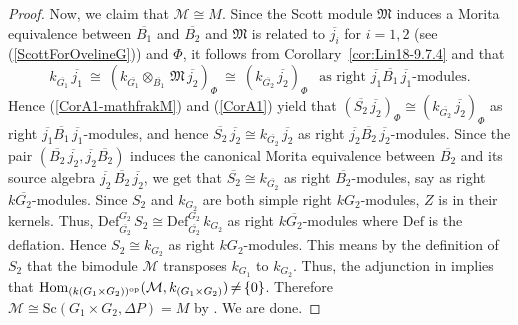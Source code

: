\documentclass[12pt,a4paper]{amsart}
\theoremstyle{plain}\newtheorem{Theorem}{Theorem}[section]
\theoremstyle{plain}\newtheorem{Conjecture}[Theorem]{Conjecture}
\theoremstyle{plain}\newtheorem{Corollary}[Theorem]{Corollary}
\theoremstyle{plain}\newtheorem{Lemma}[Theorem]{Lemma}
\theoremstyle{plain}\newtheorem{Proposition}[Theorem]{Proposition}
\theoremstyle{definition}\newtheorem{Definition}[Theorem]{Definition}
\theoremstyle{definition}\newtheorem{Example}[Theorem]{Example}
\theoremstyle{definition}\newtheorem{Examples}[Theorem]{Examples}
\theoremstyle{definition}\newtheorem{Remark}[Theorem]{Remark}
\theoremstyle{definition}\newtheorem{Question}[Theorem]{Question}
\theoremstyle{definition}\newtheorem{Notation}[Theorem]{Notation}
\theoremstyle{definition}\newtheorem{Hypothesis}[Theorem]{Hypothesis}
\theoremstyle{definition}\newtheorem{Assumption}[Theorem]{Assumption}
\theoremstyle{definition}\newtheorem{Strategy}[Theorem]{Strategy}
\theoremstyle{definition}\newtheorem{Contents}[Theorem]{Contents}
\theoremstyle{definition}\newtheorem{Computations}[Theorem]{Computations}
\theoremstyle{definition}\newtheorem{Equivalences}[Theorem]{Equivalences}
\theoremstyle{definition}\newtheorem{Notation/Definition}[Theorem]{Notation/Definition}
\theoremstyle{definition}\newtheorem{noth}[Theorem]{}
\theoremstyle{plain}\newtheorem{Step}[Theorem]{Step}
\newcommand{\Sc}{{\text{Sc}}}
\begin{document}
\begin{proof}
Now, we claim that $\mathcal M\cong M$.
Since the Scott module $\mathfrak M$ induces a Morita equivalence
between $\overline{B_1}$ and $\overline{B_2}$ and $\mathfrak M$ is related to $\overline{j_i}$
for $i=1, 2$ 
(see (\ref{ScottForOvelineG})) and $\Phi$, it follows from Corollary~\ref{cor:Lin18-9.7.4} and 
\cite[Lemma 3.4(a)]{KL20a} that
\begin{equation}\label{CorA1} 
k_{\overline{G_1}}\,\overline{j_1}
\ \cong \ (k_{\overline{G_1}}\otimes_{\overline{B_1}}\,\mathfrak M\,\overline{j_2})_\Phi
\ \cong \ (k_{\overline{G_2}}\,\overline{j_2})_\Phi   
\ \ \text{ as right }\overline{j_1}\overline{B_1}\,\overline{j_1}\text{-modules.}
\end{equation}
Hence (\ref{CorA1-mathfrakM}) and (\ref{CorA1}) yield that
$(\overline{S_2}\,\overline{j_2})_{\Phi} \cong
(k_{\overline{G_2}}\,\overline{j_2})_\Phi$ 
as right $\overline{j_1}\overline{B_1}\,\overline{j_1}$-modules, and hence
$\overline{S_2}\,\overline{j_2} \cong k_{\overline{G_2}}\,\overline{j_2}$ 
as right $\overline{j_2}\overline{B_2}\,\overline{j_2}$-modules.
Since the pair $(\overline{B_2}\,\overline{j_2}, \overline{j_2}\overline{B_2})$ induces
the canonical Morita equivalence between $\overline{B_2}$ and its source algebra
$\overline{j_2}\,\overline{B_2}\,\overline{j_2}$, we get that
$\overline{S_2}\cong k_{\overline{G_2}}$ as right $\overline{B_2}$-modules,
say as right $k\overline{G_2}$-modules.
Since $S_2$ and $k_{G_2}$ are both simple right $kG_2$-modules, %
$Z$ is in their kernels. Thus,
${\mathrm{Def}}^{G_2}_{\overline{G_2}}\, S_2 \cong {\mathrm{Def}}^{G_2}_{\overline{G_2}}\,k_{G_2}$
as right $k\overline{G_2}$-modules where ${\mathrm{Def}}$ is the deflation.
Hence $S_2\cong k_{G_2}$ as right $kG_2$-modules.
This means by the definition of $S_2$ that the bimodule $\mathcal M$ transposes $k_{G_1}$ 
to $k_{G_2}$. Thus, the adjunction in \cite[Line 9 on p.105]{Rou01} implies that
$\mathrm{Hom}_{(k(G_1\times G_2))^{\text{op}}}(\mathcal M, k_{(G_1\times G_2)})\,{\not=}\,\{ 0 \}$.
Therefore $\mathcal M\cong\Sc(G_1\times G_2,\Delta P)=M$ by \cite[Exercise (27.5)]{The95}.
We are done.
\end{proof}
\end{document}
